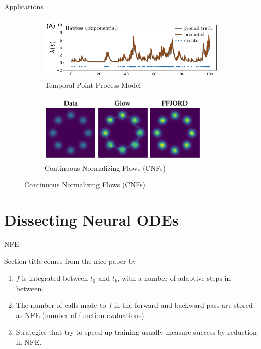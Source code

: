 \documentclass[usenames,dvipsnames]{beamer}
\theoremstyle{definition}
\let\oldcite=\cite
\renewcommand{\cite}[2][]{\textcolor{green}{\oldcite[#1]{#2}}}
\begin{document}
\begin{frame}{Applications}
\begin{figure}
      \begin{subfigure}[t]{.45\textwidth}
        \centering
        \includegraphics[width=.75\linewidth]{jia_hawkes.png}
        \caption{Temporal Point Process Model \cite{jia_neural_2020}}
      \end{subfigure}
      \qquad
      \begin{subfigure}[t]{.45\textwidth}
        \centering
        \includegraphics[width=.7\linewidth]{chen_cnf_2.png}
        \caption{Continuous Normalizing Flows (CNFs) \cite{grathwohl_ffjord:_2018}}
      \end{subfigure}
    \end{figure}
\end{frame}


\section{Dissecting Neural ODEs}

\begin{frame}{NFE}

    Section title comes from the nice paper by \cite{massaroli_dissecting_2021}

    \begin{enumerate}
        \item $f$ is integrated between $t_0$ and $t_k$, with a number of adaptive steps in between.

        \item The number of calls made to $f$ in the forward and backward pass are stored as NFE (number of function evaluations)

        \item Strategies that try to speed up training usually measure success by reduction in NFE.
    \end{enumerate}
\end{frame}
\end{document}
